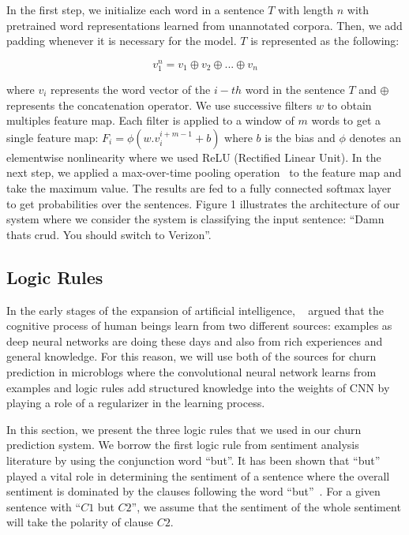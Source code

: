 \documentclass[11pt,letterpaper]{article}
\begin{document}
In the first step, we initialize each word in a sentence \(T\) with length \(n\) with pretrained word representations learned from unannotated corpora. Then, we add padding whenever it is necessary for the model. \(T\) is represented as the following:

\begin{equation} \label{equation1}v_1^n=  v_1 \oplus v_2 \oplus ... \oplus v_n \end{equation}

where \(v_i\) represents the word vector of the \(i-th\) word in the sentence \(T\) and \(\oplus\) represents the concatenation operator. We use successive filters \(w\) to obtain multiples feature map. Each filter is applied to a window of \(m\) words to get a single feature map: \(F_i=\phi(w.v_i^{i+m-1}+b)\) where \(b\) is the bias and \(\phi\) denotes an elementwise nonlinearity where we used ReLU (Rectified Linear Unit). In the next step, we applied a max-over-time pooling operation~\cite{collobert} to the feature map and take the maximum value. The results are fed to a fully connected softmax layer to get probabilities over the sentences. Figure 1 illustrates the architecture of our system where we consider the system is classifying the input sentence: \enquote{Damn thats crud. You should switch to Verizon}.

\subsection{Logic Rules }

In the early stages of the expansion of artificial intelligence, ~\cite{minsky} argued that the cognitive process of human beings learn from two different sources: examples as deep neural networks are doing these days and also from rich experiences and general knowledge. For this reason, we will use both of the sources for churn prediction in microblogs where the convolutional neural network learns from examples and logic rules add structured knowledge into the weights of CNN by playing a role of a regularizer in the learning process.

In this section, we present the three logic rules that we used in our churn prediction system. We borrow the first logic rule from sentiment analysis literature by using the conjunction word \enquote{but}. It has been shown that \enquote{but} played a vital role in determining the sentiment of a sentence where the overall sentiment is dominated by the clauses following the word \enquote{but}~\cite{jia2009,dadvar2011,hogenboom,hu}. For a given sentence with \enquote{\(C1\) but \(C2\)}, we assume that the sentiment of the whole sentiment will take the polarity of clause \(C2\).
\end{document}
